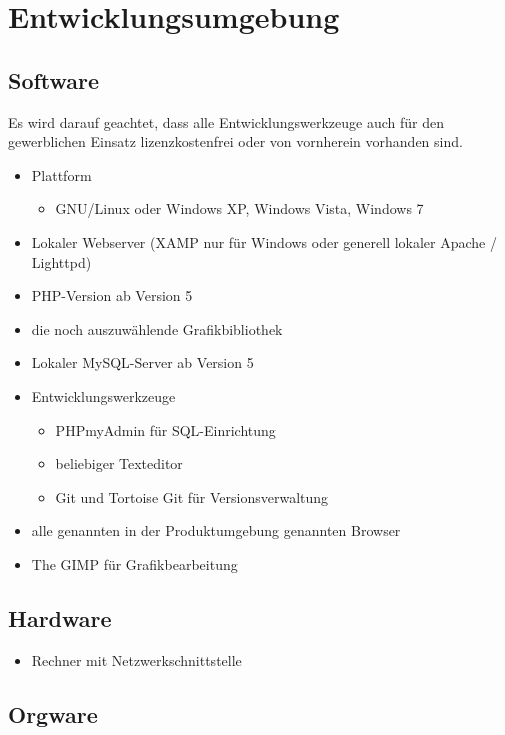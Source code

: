 \documentclass[a4paper,oneside,10pt]{scrreprt}
\begin{document}
\chapter{Entwicklungsumgebung}

\section{Software}

Es wird darauf geachtet, dass alle Entwicklungswerkzeuge auch für den gewerblichen Einsatz lizenzkostenfrei oder von vornherein vorhanden sind.

\begin{itemize}
\item Plattform
    \begin{itemize}
    \item GNU/Linux oder Windows XP, Windows Vista, Windows 7
    \end{itemize}

\item Lokaler Webserver (XAMP nur für Windows oder generell lokaler Apache / Lighttpd)
\item PHP-Version ab Version 5
\item die noch auszuwählende Grafikbibliothek
\item Lokaler MySQL-Server ab Version 5
\item Entwicklungswerkzeuge
    \begin{itemize}
    \item PHPmyAdmin für SQL-Einrichtung
    \item beliebiger Texteditor
    \item Git und Tortoise Git für Versionsverwaltung
    \end{itemize}

\item alle genannten in der Produktumgebung genannten Browser
\item The GIMP für Grafikbearbeitung
\end{itemize}

\section{Hardware}

\begin{itemize}
\item Rechner mit Netzwerkschnittstelle
\end{itemize}

\section{Orgware}
\end{document}
